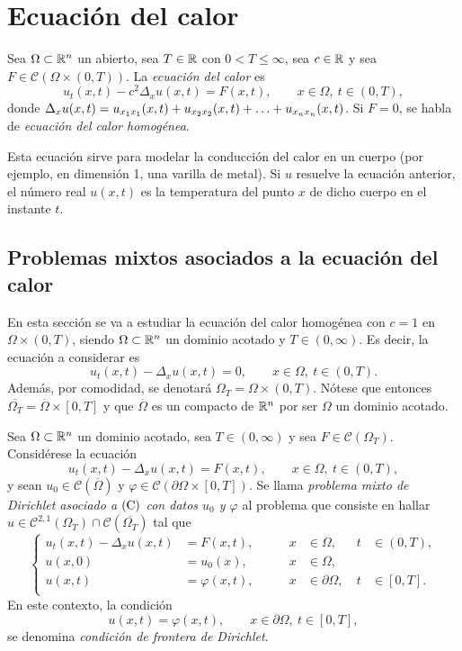 \documentclass[a4paper, 12pt, extrafontsizes]{memoir}
\begin{document}
\chapter{Ecuación del calor}

\begin{definition}
    Sea $\Omega \subset \mathbb R^n$ un abierto, sea $T \in \mathbb R$ con $0 < T \leq \infty$, sea $c \in \mathbb R$ y sea $F \in \mathcal{C}(\Omega \times (0,T))$. La \emph{ecuación del calor} es
    \[u_{t}(x,t) - c^2\Delta_xu(x,t) = F(x,t), \qquad x \in \Omega, \ t \in (0,T),\]
    donde $\Delta_xu(x,t) = u_{x_1x_1}(x,t)+u_{x_2x_2}(x,t)+\mathellipsis+u_{x_nx_n}(x,t)$. Si $F = 0$, se habla de \emph{ecuación del calor homogénea}.
\end{definition}

Esta ecuación sirve para modelar la conducción del calor en un cuerpo (por ejemplo, en dimensión 1, una varilla de metal). Si $u$ resuelve la ecuación anterior, el número real $u(x,t)$ es la temperatura del punto $x$ de dicho cuerpo en el instante $t$.

\section{Problemas mixtos asociados a la ecuación del calor}

En esta sección se va a estudiar la ecuación del calor homogénea con $c = 1$ en $\Omega \times (0,T)$, siendo $\Omega \subset \mathbb R^n$ un dominio acotado y $T \in (0,\infty)$. Es decir, la ecuación a considerar es
\[u_{t}(x,t) - \Delta_xu(x,t) = 0, \qquad x \in \Omega, \ t \in (0,T).\]
Además, por comodidad, se denotará $\Omega_T = \Omega \times (0,T)$. Nótese que entonces $\overline{\Omega_T} = \overline{\Omega} \times [0,T]$ y que $\overline{\Omega}$ es un compacto de $\mathbb R^n$ por ser $\Omega$ un dominio acotado.

\begin{definition}
    Sea $\Omega \subset \mathbb R^n$ un dominio acotado, sea $T \in (0,\infty)$ y sea $F \in \mathcal{C}(\Omega_T)$. Considérese la ecuación
    \[u_{t}(x,t) - \Delta_xu(x,t) = F(x,t), \qquad x \in \Omega, \ t \in (0,T), \tag{C}\]
    y sean $u_0 \in \mathcal{C}(\overline{\Omega})$ y $\varphi \in \mathcal{C}(\partial\Omega \times [0,T])$. Se llama \emph{problema mixto de Dirichlet asociado a $\textup{(C)}$ con datos $u_0$ y $\varphi$} al problema que consiste en hallar $u \in \mathcal{C}^{2,1}(\Omega_T) \cap \mathcal{C}(\overline{\Omega_T})$ tal que
    \[
        \left\{\begin{alignedat}{5}
            u_{t}(x,t)-\Delta_xu(x,t) &= F(x,t), \qquad & x &\in \Omega, \ & t &\in (0,T), \\
            u(x,0) &= u_0(x), \qquad & x &\in \Omega, & & \\
            u(x,t) &= \varphi(x,t), \qquad & x &\in \partial\Omega, \ & t &\in [0,T]. \\
        \end{alignedat}\right.
    \]
    En este contexto, la condición
    \[u(x,t) = \varphi(x,t), \qquad  x \in \partial\Omega, \  t \in [0,T],\]
    se denomina \emph{condición de frontera de Dirichlet}.
\end{definition}
\end{document}

